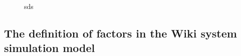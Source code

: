 \documentclass{elsarticle}
\begin{document}
\begin{figure}[htpb]
  \centering
  \caption{sds}
\end{figure}
\subsection{The definition of factors in the Wiki system simulation model
}
\label{sec:defin-fact-wiki}
\end{document}
